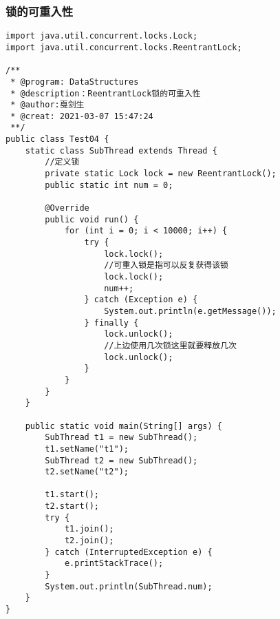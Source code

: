 \documentclass[a4paper]{report}
\begin{document}
\subsubsection{锁的可重入性}
\begin{Verbatim}[frame=single,numbersep=5pt,xleftmargin=1.5em,xrightmargin=1.5em]
import java.util.concurrent.locks.Lock;
import java.util.concurrent.locks.ReentrantLock;

/**
 * @program: DataStructures
 * @description：ReentrantLock锁的可重入性
 * @author:戛剑生
 * @creat: 2021-03-07 15:47:24
 **/
public class Test04 {
    static class SubThread extends Thread {
        //定义锁
        private static Lock lock = new ReentrantLock();
        public static int num = 0;

        @Override
        public void run() {
            for (int i = 0; i < 10000; i++) {
                try {
                    lock.lock();
                    //可重入锁是指可以反复获得该锁
                    lock.lock();
                    num++;
                } catch (Exception e) {
                    System.out.println(e.getMessage());
                } finally {
                    lock.unlock();
                    //上边使用几次锁这里就要释放几次
                    lock.unlock();
                }
            }
        }
    }

    public static void main(String[] args) {
        SubThread t1 = new SubThread();
        t1.setName("t1");
        SubThread t2 = new SubThread();
        t2.setName("t2");

        t1.start();
        t2.start();
        try {
            t1.join();
            t2.join();
        } catch (InterruptedException e) {
            e.printStackTrace();
        }
        System.out.println(SubThread.num);
    }
}
\end{Verbatim}
\end{document}
